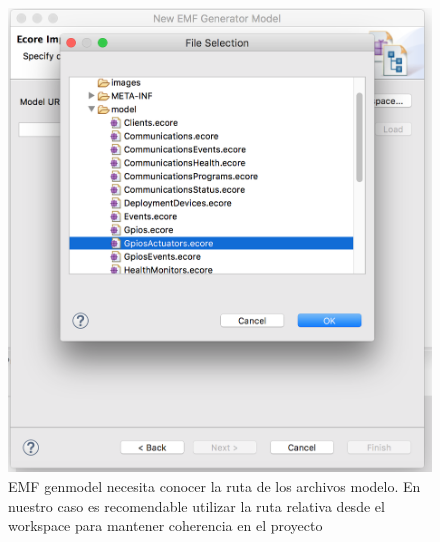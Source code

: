 \begin{figure}
    \centering
    \includegraphics[scale=0.4]{images/emf_capturas/genmodel_5.png}
    \sourcepropia{}
    \caption[Genmodel ruta del proyecto]{EMF genmodel necesita conocer la ruta de los archivos modelo. En nuestro caso es recomendable utilizar la ruta relativa desde el workspace para mantener coherencia en el proyecto}
    \label{fig:modelo_genmodel_paso5}
\end{figure}
